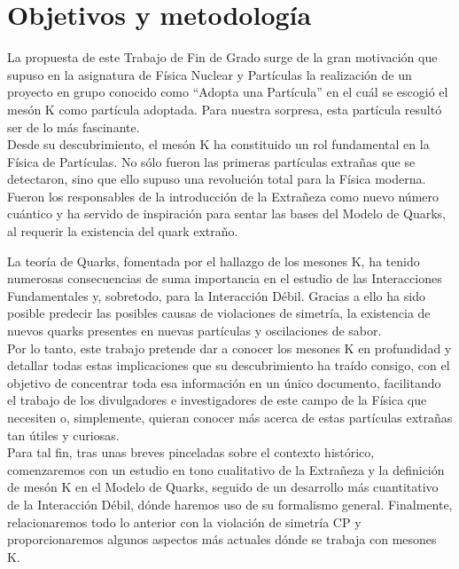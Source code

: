 \chapter*{Objetivos y metodología}
\label{cap:objetivos}

La propuesta de este Trabajo de Fin de Grado surge de la gran motivación que supuso en la asignatura de Física Nuclear y Partículas la realización de un proyecto en grupo conocido como ``Adopta una Partícula'' en el cuál se escogió el mesón K como partícula adoptada. Para nuestra sorpresa, esta partícula resultó ser de lo más fascinante.\\


Desde su descubrimiento, el mesón K ha constituido un rol fundamental en la Física de Partículas. No sólo fueron las primeras partículas extrañas que se detectaron, sino que ello supuso una revolución total para la Física moderna. Fueron los responsables de la introducción de la Extrañeza como nuevo número cuántico y ha servido de inspiración para sentar las bases del Modelo de Quarks, al requerir la existencia del quark extraño.

La teoría de Quarks, fomentada por el hallazgo de los mesones K, ha tenido numerosas consecuencias de suma importancia en el estudio de las Interacciones Fundamentales y, sobretodo, para la Interacción Débil. Gracias a ello ha sido posible predecir las posibles causas de violaciones de simetría, la existencia de nuevos quarks presentes en nuevas partículas y oscilaciones de sabor. \\


Por lo tanto, este trabajo pretende dar a conocer los mesones K en profundidad y detallar todas estas implicaciones que su descubrimiento ha traído consigo, con el objetivo de concentrar toda esa información en un único documento, facilitando el trabajo de los divulgadores e investigadores de este campo de la Física que necesiten o, simplemente, quieran conocer más acerca de estas partículas extrañas tan útiles y curiosas.\\


Para tal fin, tras unas breves pinceladas sobre el contexto histórico, comenzaremos con un estudio en tono cualitativo de la Extrañeza y la definición de mesón K en el Modelo de Quarks, seguido de un desarrollo más cuantitativo de la Interacción Débil, dónde haremos uso de su formalismo general. Finalmente, relacionaremos todo lo anterior con la violación de simetría CP y proporcionaremos algunos aspectos más actuales dónde se trabaja con mesones K.



